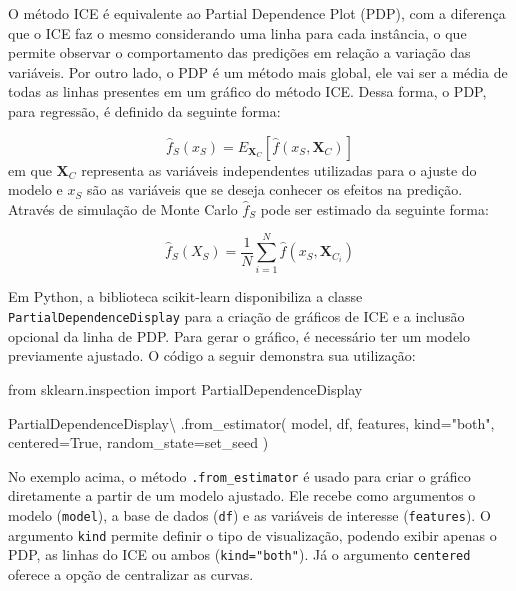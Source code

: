 \documentclass[
  12pt,
  a4paper,
]{scrreprt}
\newenvironment{Shaded}{}{}
\newcommand{\ImportTok}[1]{\textcolor[rgb]{0.01,0.18,0.38}{#1}}
\newcommand{\NormalTok}[1]{\textcolor[rgb]{0.14,0.16,0.18}{#1}}
\newcommand{\OperatorTok}[1]{\textcolor[rgb]{0.14,0.16,0.18}{#1}}
\newcommand{\StringTok}[1]{\textcolor[rgb]{0.01,0.18,0.38}{#1}}
\newcommand{\VariableTok}[1]{\textcolor[rgb]{0.89,0.38,0.04}{#1}}
\begin{document}
\vspace{12pt}

O método ICE é equivalente ao Partial Dependence Plot (PDP), com a
diferença que o ICE faz o mesmo considerando uma linha para cada
instância, o que permite observar o comportamento das predições em
relação a variação das variáveis. Por outro lado, o PDP é um método mais
global, ele vai ser a média de todas as linhas presentes em um gráfico
do método ICE. Dessa forma, o PDP, para regressão, é definido da
seguinte forma:

\[
\hat{f}_{S}\left(x_{S}\right) = E_{\mathbf{X}_{C}}\left[\hat{f}\left(x_{S}, \mathbf{X}_{C}\right)\right]
\] em que \(\mathbf{X}_C\) representa as variáveis independentes
utilizadas para o ajuste do modelo e \(x_S\) são as variáveis que se
deseja conhecer os efeitos na predição. Através de simulação de Monte
Carlo \(\hat{f}_S\) pode ser estimado da seguinte forma:

\[
\hat{f}_S\left(X_S\right) = \frac{1}{N} \sum^{N}_{i=1}\hat{f}\left(x_{S}, \mathbf{X}_{C_i}\right)
\]

Em Python, a biblioteca scikit-learn disponibiliza a classe
\texttt{PartialDependenceDisplay} para a criação de gráficos de ICE e a
inclusão opcional da linha de PDP. Para gerar o gráfico, é necessário
ter um modelo previamente ajustado. O código a seguir demonstra sua
utilização:

\begin{Shaded}
\begin{Highlighting}[]
\ImportTok{from}\NormalTok{ sklearn.inspection }\ImportTok{import}\NormalTok{ PartialDependenceDisplay}

\NormalTok{PartialDependenceDisplay}\OperatorTok{\textbackslash{}}
\NormalTok{    .from\_estimator(}
\NormalTok{        model,}
\NormalTok{        df,}
\NormalTok{        features,}
\NormalTok{        kind}\OperatorTok{=}\StringTok{"both"}\NormalTok{,}
\NormalTok{        centered}\OperatorTok{=}\VariableTok{True}\NormalTok{,}
\NormalTok{        random\_state}\OperatorTok{=}\NormalTok{set\_seed}
\NormalTok{    )}
\end{Highlighting}
\end{Shaded}

No exemplo acima, o método \texttt{.from\_estimator} é usado para criar
o gráfico diretamente a partir de um modelo ajustado. Ele recebe como
argumentos o modelo (\texttt{model}), a base de dados (\texttt{df}) e as
variáveis de interesse (\texttt{features}). O argumento \texttt{kind}
permite definir o tipo de visualização, podendo exibir apenas o PDP, as
linhas do ICE ou ambos (\texttt{kind="both"}). Já o argumento
\texttt{centered} oferece a opção de centralizar as curvas.
\end{document}

